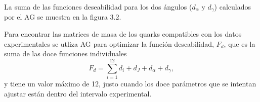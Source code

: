 La suma de las funciones deseabilidad para los dos \'angulos ($d_{\alpha}$ y 
$d_{\gamma}$) calculados por el AG se muestra en la figura 3.2.


Para encontrar las matrices de masa de los quarks compatibles con los datos 
experimentales se utliza AG para optimizar la funci\'on  deseabilidad, $F_d$,
que es la suma de las doce funciones individuales
$$F_d=\sum^{12}_{i=1}d_i+d_J+d_{\alpha}+d_{\gamma},$$
y tiene un valor m\'aximo de 12, justo cuando los doce par\'ametros que se
intentan ajustar est\'an dentro del intervalo experimental.  

